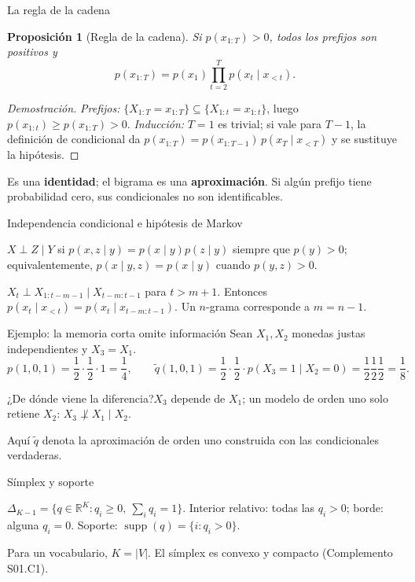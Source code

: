 \documentclass[aspectratio=169,10pt]{beamer}
\newtheorem{proposicion}{Proposición}
\begin{document}
\begin{frame}{La regla de la cadena}
\begin{proposicion}[Regla de la cadena]
Si $p(x_{1:T})>0$, todos los prefijos son positivos y
\[p(x_{1:T})=p(x_1)\prod_{t=2}^T p(x_t\mid x_{<t}).\]
\end{proposicion}
\begin{proof}[Demostración]
\emph{Prefijos:} $\{X_{1:T}=x_{1:T}\}\subseteq\{X_{1:t}=x_{1:t}\}$, luego $p(x_{1:t})\ge p(x_{1:T})>0$.
\emph{Inducción:} $T=1$ es trivial; si vale para $T-1$, la definición de condicional da
$p(x_{1:T})=p(x_{1:T-1})\,p(x_T\mid x_{<T})$ y se sustituye la hipótesis.
\end{proof}
\small Es una \textbf{identidad}; el bigrama es una \textbf{aproximación}. Si algún prefijo tiene probabilidad cero, sus condicionales no son identificables.
\end{frame}

\begin{frame}{Independencia condicional e hipótesis de Markov}
\begin{definition}
$X\perp Z\mid Y$ si $p(x,z\mid y)=p(x\mid y)p(z\mid y)$ siempre que $p(y)>0$;
equivalentemente, $p(x\mid y,z)=p(x\mid y)$ cuando $p(y,z)>0$.
\end{definition}
\begin{definition}
$X_t\perp X_{1:t-m-1}\mid X_{t-m:t-1}$ para $t>m+1$. Entonces
$p(x_t\mid x_{<t})=p(x_t\mid x_{t-m:t-1})$. Un $n$-grama corresponde a $m=n-1$.
\end{definition}
\end{frame}

\begin{frame}{Ejemplo: la memoria corta omite información}
Sean $X_1,X_2$ monedas justas independientes y $X_3=X_1$.\\[2mm]
\[p(1,0,1)=\frac12\cdot\frac12\cdot1=\frac14,\qquad
\widetilde q(1,0,1)=\frac12\cdot\frac12\cdot p(X_3=1\mid X_2=0)=\frac12\frac12\frac12=\frac18.\]
\begin{block}{¿De dónde viene la diferencia?}\centering $X_3$ depende de $X_1$; un modelo de orden uno solo retiene $X_2$: $X_3\not\perp X_1\mid X_2$.\end{block}
\small Aquí $\widetilde q$ denota la aproximación de orden uno construida con las condicionales verdaderas.
\end{frame}

\begin{frame}{Símplex y soporte}
\begin{definition}
$\Delta_{K-1}=\{q\in\mathbb R^K: q_i\ge0,\ \sum_iq_i=1\}$. Interior relativo: todas
las $q_i>0$; borde: alguna $q_i=0$. Soporte: $\operatorname{supp}(q)=\{i:q_i>0\}$.
\end{definition}
\medskip
\small Para un vocabulario, $K=|V|$. El símplex es convexo y compacto (Complemento S01.C1).
\end{frame}
\end{document}
